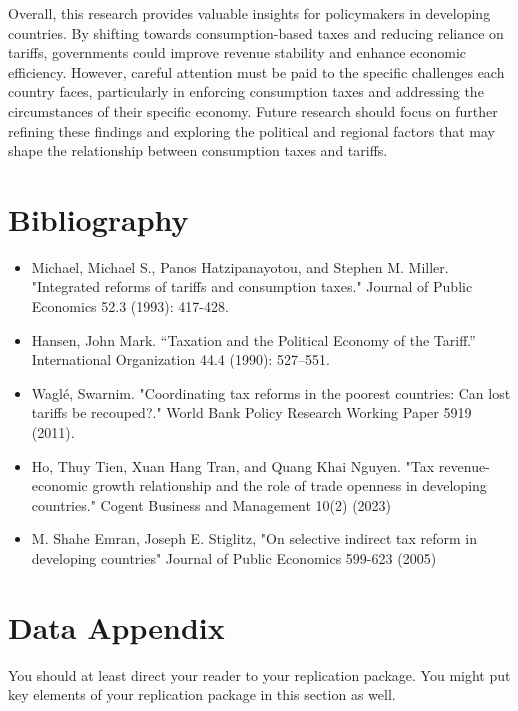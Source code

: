 \documentclass[12pt]{article}
\begin{document}
Overall, this research provides valuable insights for policymakers in developing countries. By shifting towards consumption-based taxes and reducing reliance on tariffs, governments could improve revenue stability and enhance economic efficiency. However, careful attention must be paid to the specific challenges each country faces, particularly in enforcing consumption taxes and addressing the circumstances of their specific economy. Future research should focus on further refining these findings and exploring the political and regional factors that may shape the relationship between consumption taxes and tariffs.



\newpage
\section*{Bibliography}
\singlespacing
\setlength\bibsep{0pt}

\begin{itemize}
\item Michael, Michael S., Panos Hatzipanayotou, and Stephen M. Miller. "Integrated reforms of tariffs and consumption taxes." Journal of Public Economics 52.3 (1993): 417-428.
\item Hansen, John Mark. “Taxation and the Political Economy of the Tariff.” International Organization 44.4 (1990): 527–551.
\item Waglé, Swarnim. "Coordinating tax reforms in the poorest countries: Can lost tariffs be recouped?." World Bank Policy Research Working Paper 5919 (2011).
\item Ho, Thuy Tien, Xuan Hang Tran, and Quang Khai Nguyen. "Tax revenue-economic growth relationship and the role of trade openness in developing countries." Cogent Business and Management 10(2) (2023)
\item M. Shahe Emran, Joseph E. Stiglitz, "On selective indirect tax reform in developing countries" Journal of Public Economics 599-623 (2005)
\end{itemize}










\newpage
\section*{Data Appendix} \label{sec:appendixa}


You should at least direct your reader to your replication package. You might put key elements of your replication package in this section as well.
\end{document}

